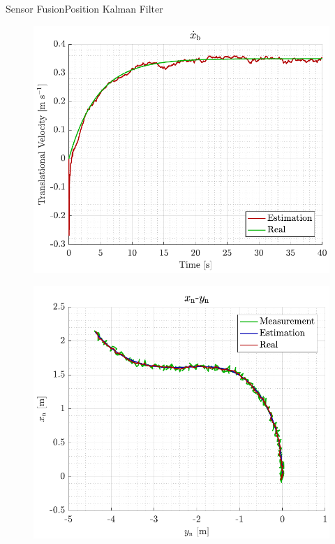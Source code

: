 \begin{frame}{Sensor Fusion}{Position Kalman Filter}
    \begin{minipage}{0.45\linewidth}
        \begin{figure}[H]
            \centering
            \includegraphics[width=1\linewidth]{figures/sim_xbdot}
        \end{figure}        
    \end{minipage}\hfill      
    \begin{minipage}{0.45\linewidth}
        \begin{figure}[H]
            \centering
            \includegraphics[width=1\linewidth]{figures/sim_xnyn}
        \end{figure}                
    \end{minipage}\hfill \\
\end{frame}

